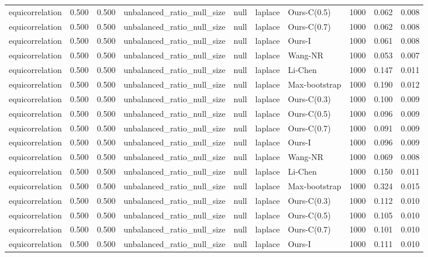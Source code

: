 \begin{tabular}{lrrllllrrr}
equicorrelation & 0.500 & 0.500 & unbalanced\_ratio\_null\_size & null & laplace & Ours-C(0.5) & 1000 & 0.062 & 0.008 \\
equicorrelation & 0.500 & 0.500 & unbalanced\_ratio\_null\_size & null & laplace & Ours-C(0.7) & 1000 & 0.062 & 0.008 \\
equicorrelation & 0.500 & 0.500 & unbalanced\_ratio\_null\_size & null & laplace & Ours-I & 1000 & 0.061 & 0.008 \\
equicorrelation & 0.500 & 0.500 & unbalanced\_ratio\_null\_size & null & laplace & Wang-NR & 1000 & 0.053 & 0.007 \\
equicorrelation & 0.500 & 0.500 & unbalanced\_ratio\_null\_size & null & laplace & Li-Chen & 1000 & 0.147 & 0.011 \\
equicorrelation & 0.500 & 0.500 & unbalanced\_ratio\_null\_size & null & laplace & Max-bootstrap & 1000 & 0.190 & 0.012 \\
equicorrelation & 0.500 & 0.500 & unbalanced\_ratio\_null\_size & null & laplace & Ours-C(0.3) & 1000 & 0.100 & 0.009 \\
equicorrelation & 0.500 & 0.500 & unbalanced\_ratio\_null\_size & null & laplace & Ours-C(0.5) & 1000 & 0.096 & 0.009 \\
equicorrelation & 0.500 & 0.500 & unbalanced\_ratio\_null\_size & null & laplace & Ours-C(0.7) & 1000 & 0.091 & 0.009 \\
equicorrelation & 0.500 & 0.500 & unbalanced\_ratio\_null\_size & null & laplace & Ours-I & 1000 & 0.096 & 0.009 \\
equicorrelation & 0.500 & 0.500 & unbalanced\_ratio\_null\_size & null & laplace & Wang-NR & 1000 & 0.069 & 0.008 \\
equicorrelation & 0.500 & 0.500 & unbalanced\_ratio\_null\_size & null & laplace & Li-Chen & 1000 & 0.150 & 0.011 \\
equicorrelation & 0.500 & 0.500 & unbalanced\_ratio\_null\_size & null & laplace & Max-bootstrap & 1000 & 0.324 & 0.015 \\
equicorrelation & 0.500 & 0.500 & unbalanced\_ratio\_null\_size & null & laplace & Ours-C(0.3) & 1000 & 0.112 & 0.010 \\
equicorrelation & 0.500 & 0.500 & unbalanced\_ratio\_null\_size & null & laplace & Ours-C(0.5) & 1000 & 0.105 & 0.010 \\
equicorrelation & 0.500 & 0.500 & unbalanced\_ratio\_null\_size & null & laplace & Ours-C(0.7) & 1000 & 0.101 & 0.010 \\
equicorrelation & 0.500 & 0.500 & unbalanced\_ratio\_null\_size & null & laplace & Ours-I & 1000 & 0.111 & 0.010 \\

\end{tabular}
